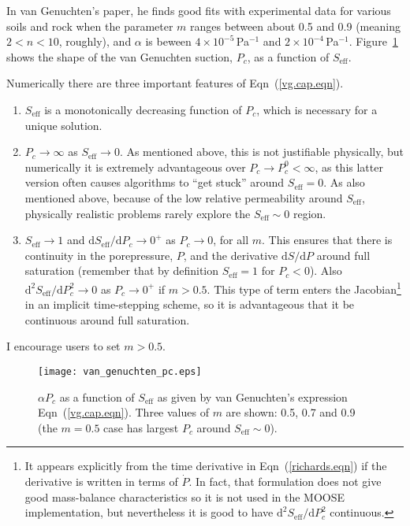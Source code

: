 \documentclass[]{scrreprt}
\begin{document}
In van Genuchten's paper, he finds good fits with experimental data
for various soils and rock when the parameter $m$ ranges between about
0.5 and 0.9 (meaning $2<n<10$, roughly), and $\alpha$ is beween
$4\times 10^{-5}$\,Pa$^{-1}$ and $2\times 10^{-4}$\,Pa$^{-1}$.
Figure~\ref{van_genuchten_pc.fig} shows the shape of the van Genuchten
suction, $P_{c}$, as a function of $S_{\mathrm{eff}}$.

Numerically there are three important features of
Eqn~(\ref{vg.cap.eqn}).
\begin{enumerate}
\item $S_{\mathrm{eff}}$ is a monotonically decreasing function of
  $P_{c}$, which is necessary for a unique solution.
\item $P_{c}\rightarrow \infty$ as $S_{\mathrm{eff}}\rightarrow 0$.  As mentioned
above, this is not justifiable physically, but numerically it is
extremely advantageous over $P_{c}\rightarrow P_{c}^{0}<\infty$, as
this latter version often causes algorithms to ``get stuck'' around
$S_{\mathrm{eff}} = 0$.  As also mentioned above, because of the low
relative permeability around $S_{\mathrm{eff}}$, physically realistic
problems rarely explore the $S_{\mathrm{eff}}\sim 0$ region.
\item $S_{\mathrm{eff}}\rightarrow 1$ and
  $\mathrm{d}S_{\mathrm{eff}}/\mathrm{d}P_{c} \rightarrow 0^{+}$ as
  $P_{c}\rightarrow 0$, for all $m$.  This ensures that there is
  continuity in the porepressure, $P$, and the derivative
  $\mathrm{d}S/\mathrm{d}P$ around full saturation (remember that by definition
  $S_{\mathrm{eff}}=1$ for $P_{c}<0$).  Also
  $\mathrm{d}^{2}S_{\mathrm{eff}}/\mathrm{d}P_{c}^{2} \rightarrow 0$
  as $P_{c}\rightarrow 0^{+}$ if $m>0.5$.  This type of term enters the
  Jacobian\footnote{It appears explicitly from the time derivative in
    Eqn~(\ref{richards.eqn}) if the derivative is written in terms of
    $\dot{P}$.  In fact, that formulation does not give good
    mass-balance characteristics so it is not used in the MOOSE implementation, but
    nevertheless it is good to have
    $\mathrm{d}^{2}S_{\mathrm{eff}}/\mathrm{d}P_{c}^{2}$ continuous.}
  in an implicit time-stepping scheme, so it is advantageous that it
  be continuous around full saturation.
\end{enumerate}
I encourage users to set $m>0.5$.

\begin{figure}[htb]
\centering
\texttt{[image: van\_genuchten\_pc.eps]}
\caption{$\alpha P_{c}$ as a function of $S_{\mathrm{eff}}$ as given
  by van Genuchten's expression Eqn~(\ref{vg.cap.eqn}).  Three values
  of $m$ are shown: 0.5, 0.7 and 0.9 (the $m=0.5$ case has largest
  $P_{c}$ around $S_{\mathrm{eff}}\sim 0$).}
\label{van_genuchten_pc.fig}
\end{figure}
\end{document}
